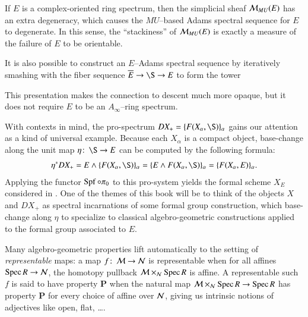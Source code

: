 \begin{remark}\label{StackinessMeasuresNonorientability}
If $E$ is a complex-oriented ring spectrum, then the simplicial sheaf $\mathcal{M}_{MU}(E)$ has an extra degeneracy, which causes the $MU$--based Adams spectral sequence for $E$ to degenerate.  In this sense, the ``stackiness'' of $\mathcal{M}_{MU}(E)$ is exactly a measure of the failure of $E$ to be orientable.
\end{remark}

\begin{remark}
It is also possible to construct an $E$--Adams spectral sequence by iteratively smashing with the fiber sequence $\overline E \to \S \to E$ to form the tower
\begin{center}
\end{center}
This presentation makes the connection to descent much more opaque, but it does not require $E$ to be an $A_\infty$--ring spectrum.
\end{remark}

\begin{remark}
With contexts in mind, the pro-spectrum $DX_+ = \{F(X_\alpha, \S)\}_\alpha$ gains our attention as a kind of universal example.  Because each $X_\alpha$ is a compact object, base-change along the unit map $\eta\co \S \to E$ can be computed by the following formula:
\begin{align*}
\eta^* DX_+ = E \sm \{F(X_\alpha, \S)\}_\alpha = \{E \sm F(X_\alpha, \S)\}_\alpha = \{F(X_\alpha, E)\}_\alpha.
\end{align*}
Applying the functor $\operatorname{Spf} \circ \pi_0$ to this pro-system yields the formal scheme $X_E$ considered in .  One of the themes of this book will be to think of the objects $X$ and $DX_+$ as spectral incarnations of some formal group construction, which base-change along $\eta$ to specialize to classical algebro-geometric constructions applied to the formal group associated to $E$.
\end{remark}

\begin{remark}
Many algebro-geometric properties lift automatically to the setting of \textit{representable} maps: a map $f\colon\thinspace \mathcal{M} \to \mathcal{N}$ is representable when for all affines $\operatorname{Spec} R \to \mathcal{N}$, the homotopy pullback $\mathcal{M} \times_{\mathcal{N}} \operatorname{Spec} R$ is affine.  A representable such $f$ is said to have property \textbf{P} when the natural map $\mathcal{M} \times_{\mathcal{N}} \operatorname{Spec} R \to \operatorname{Spec} R$ has property \textbf{P} for every choice of affine over $\mathcal{N}$, giving us intrinsic notions of adjectives like open, flat, \ldots.
\end{remark}










